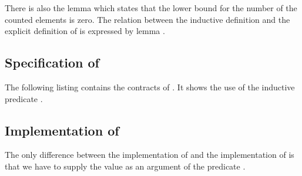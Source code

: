 

There is also the lemma 
which states that the lower bound for the number of the counted elements is zero.
%
The relation between the inductive definition \CountInd and the explicit 
definition of  is expressed
by lemma .



\clearpage

\subsection{Specification of \countii}

The following listing contains the contracts of .
It shows the use of the inductive predicate 
.



\subsection{Implementation of \countii}

The only difference between the implementation of  
and the implementation of 
is that we have to supply the value  as an argument
of the predicate .



\clearpage

